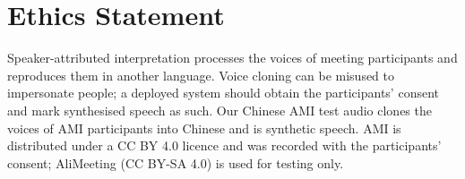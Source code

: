 \section*{Ethics Statement}

Speaker-attributed interpretation processes the voices of meeting participants and reproduces them in another
language. Voice cloning can be misused to impersonate people; a deployed system should obtain the participants'
consent and mark synthesised speech as such. Our Chinese AMI test audio clones the voices of AMI participants into
Chinese and is synthetic speech. AMI is distributed under a CC BY 4.0 licence and was recorded with the participants'
consent; AliMeeting (CC BY-SA 4.0) is used for testing only.
